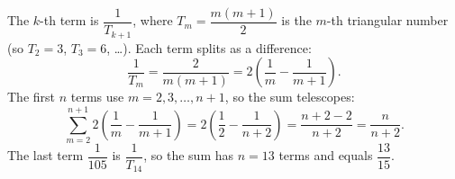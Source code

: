 The $k$-th term is $\dfrac{1}{T_{k+1}}$, where $T_m=\dfrac{m(m+1)}{2}$ is the $m$-th triangular number (so $T_2=3$, $T_3=6$, \dots). Each term splits as a difference:
\[
\dfrac{1}{T_m}=\dfrac{2}{m(m+1)}=2\left(\dfrac{1}{m}-\dfrac{1}{m+1}\right).
\]
The first $n$ terms use $m=2,3,\dots,n+1$, so the sum telescopes:
\[
\sum_{m=2}^{n+1}2\left(\dfrac{1}{m}-\dfrac{1}{m+1}\right)=2\left(\dfrac{1}{2}-\dfrac{1}{n+2}\right)=\dfrac{n+2-2}{n+2}=\dfrac{n}{n+2}.
\]
The last term $\dfrac{1}{105}$ is $\dfrac{1}{T_{14}}$, so the sum has $n=13$ terms and equals $\boxed{\dfrac{13}{15}}$.
